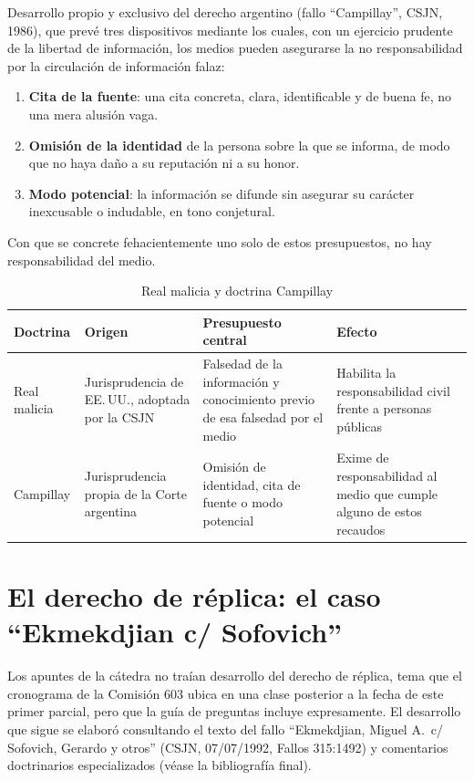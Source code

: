 \documentclass[12pt,oneside]{book}
\begin{document}
\begin{defbox}
Desarrollo propio y exclusivo del derecho argentino (fallo ``Campillay'', CSJN,
1986), que prevé tres dispositivos mediante los cuales, con un ejercicio prudente
de la libertad de información, los medios pueden asegurarse la no responsabilidad
por la circulación de información falaz:
\begin{enumerate}[leftmargin=1.4em]
  \item \textbf{Cita de la fuente}: una cita concreta, clara, identificable y de
  buena fe, no una mera alusión vaga.
  \item \textbf{Omisión de la identidad} de la persona sobre la que se informa,
  de modo que no haya daño a su reputación ni a su honor.
  \item \textbf{Modo potencial}: la información se difunde sin asegurar su
  carácter inexcusable o indudable, en tono conjetural.
\end{enumerate}
Con que se concrete fehacientemente uno solo de estos presupuestos, no hay
responsabilidad del medio.
\end{defbox}

\begin{table}[H]
\centering
\caption{Real malicia y doctrina Campillay}
\begin{tabularx}{\textwidth}{@{}lXXX@{}}
\toprule
\textbf{Doctrina} & \textbf{Origen} & \textbf{Presupuesto central} & \textbf{Efecto} \\
\midrule
Real malicia & Jurisprudencia de EE.\,UU., adoptada por la CSJN & Falsedad de la
información y conocimiento previo de esa falsedad por el medio & Habilita la
responsabilidad civil frente a personas públicas \\
Campillay & Jurisprudencia propia de la Corte argentina & Omisión de identidad,
cita de fuente o modo potencial & Exime de responsabilidad al medio que cumple
alguno de estos recaudos \\
\bottomrule
\end{tabularx}
\end{table}

\section{El derecho de réplica: el caso ``Ekmekdjian c/ Sofovich''}

\begin{notebox}
Los apuntes de la cátedra no traían desarrollo del derecho de réplica, tema que el
cronograma de la Comisión 603 ubica en una clase posterior a la fecha de este
primer parcial, pero que la guía de preguntas incluye expresamente. El desarrollo
que sigue se elaboró consultando el texto del fallo ``Ekmekdjian, Miguel A.\ c/
Sofovich, Gerardo y otros'' (CSJN, 07/07/1992, Fallos 315:1492) y comentarios
doctrinarios especializados (véase la bibliografía final).
\end{notebox}
\end{document}
